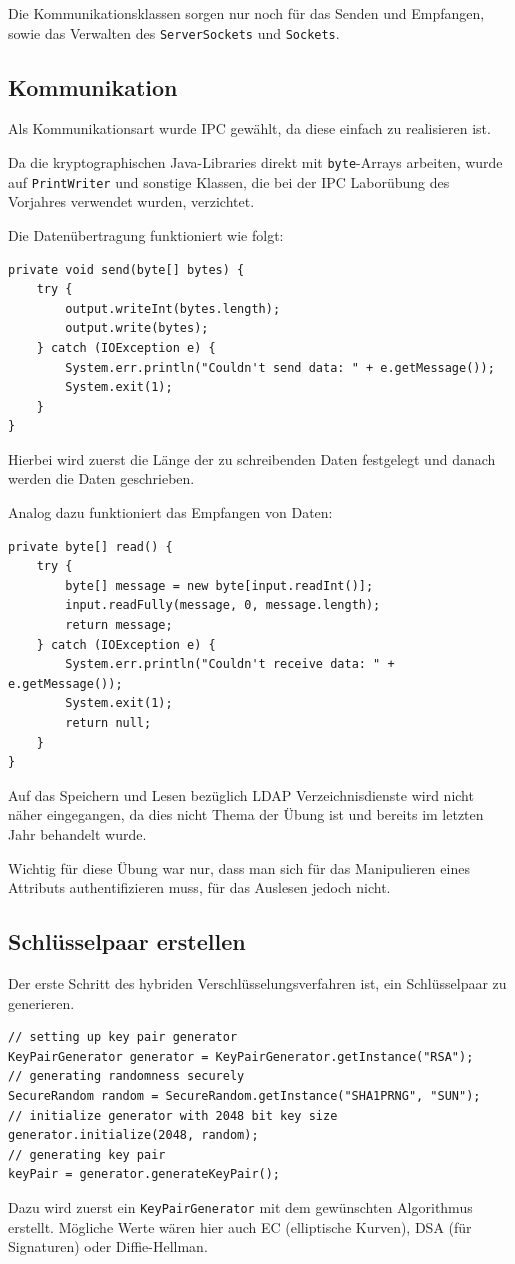Die Kommunikationsklassen sorgen nur noch für das Senden und Empfangen, sowie das Verwalten des \texttt{ServerSockets} und \texttt{Sockets}.
\subsection{Kommunikation}
Als Kommunikationsart wurde IPC gewählt, da diese einfach zu realisieren ist.

Da die kryptographischen Java-Libraries direkt mit \texttt{byte}-Arrays arbeiten, wurde auf \texttt{PrintWriter} und sonstige Klassen, die bei der IPC Laborübung des Vorjahres verwendet wurden, verzichtet.

Die Datenübertragung funktioniert wie folgt:
\begin{lstlisting}[style=Java, caption=Senden per \texttt{DataOutputStream}]
private void send(byte[] bytes) {
	try {
		output.writeInt(bytes.length);
		output.write(bytes);
	} catch (IOException e) {
		System.err.println("Couldn't send data: " + e.getMessage());
		System.exit(1);
	}
}
\end{lstlisting}
Hierbei wird zuerst die Länge der zu schreibenden Daten festgelegt und danach werden die Daten geschrieben.

Analog dazu funktioniert das Empfangen von Daten:
\begin{lstlisting}[style=Java, caption=Empfangen per \texttt{DataInputStream}]
private byte[] read() {
	try {
		byte[] message = new byte[input.readInt()];
		input.readFully(message, 0, message.length);
		return message;
	} catch (IOException e) {
		System.err.println("Couldn't receive data: " + e.getMessage());
		System.exit(1);
		return null;
	}
}
\end{lstlisting}
Auf das Speichern und Lesen bezüglich LDAP Verzeichnisdienste wird nicht näher eingegangen, da dies nicht Thema der Übung ist und bereits im letzten Jahr behandelt wurde.

Wichtig für diese Übung war nur, dass man sich für das Manipulieren eines Attributs authentifizieren muss, für das Auslesen jedoch nicht.
\subsection{Schlüsselpaar erstellen}
Der erste Schritt des hybriden Verschlüsselungsverfahren ist, ein Schlüsselpaar zu generieren.
\begin{lstlisting}[style=Java, caption=Generieren eines Schlüsselpaars]
// setting up key pair generator
KeyPairGenerator generator = KeyPairGenerator.getInstance("RSA");
// generating randomness securely
SecureRandom random = SecureRandom.getInstance("SHA1PRNG", "SUN");
// initialize generator with 2048 bit key size
generator.initialize(2048, random);
// generating key pair
keyPair = generator.generateKeyPair();
\end{lstlisting}
Dazu wird zuerst ein \texttt{KeyPairGenerator} mit dem gewünschten Algorithmus erstellt. Mögliche Werte wären hier auch EC (elliptische Kurven), DSA (für Signaturen) oder Diffie-Hellman.

